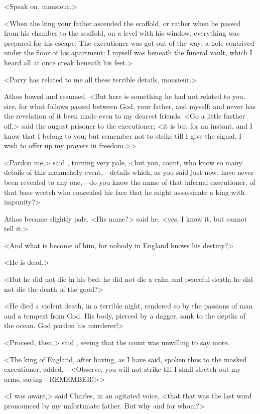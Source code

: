 <Speak on, monsieur.>

<When the king your father ascended the scaffold, or rather when he passed from his chamber to the scaffold, on a level with his window, everything was prepared for his escape. The executioner was got out of the way; a hole contrived under the floor of his apartment; I myself was beneath the funeral vault, which I heard all at once creak beneath his feet.>

<Parry has related to me all these terrible details, monsieur.>

Athos bowed and resumed. <But here is something he had not related to you, sire, for what follows passed between God, your father, and myself; and never has the revelation of it been made even to my dearest friends. <Go a little further off,> said the august prisoner to the executioner; <it is but for an instant, and I know that I belong to you; but remember not to strike till I give the signal. I wish to offer up my prayers in freedom.>>

<Pardon me,> said , turning very pale, <but you, count, who know so many details of this melancholy event,—details which, as you said just now, have never been revealed to any one,—do you know the name of that infernal executioner, of that base wretch who concealed his face that he might assassinate a king with impunity?>

Athos became slightly pale. <His name?> said he, <yes, I know it, but cannot tell it.>

<And what is become of him, for nobody in England knows his destiny?>

<He is dead.>

<But he did not die in his bed; he did not die a calm and peaceful death; he did not die the death of the good?>

<He died a violent death, in a terrible night, rendered so by the passions of man and a tempest from God. His body, pierced by a dagger, sank to the depths of the ocean. God pardon his murderer!>

<Proceed, then,> said , seeing that the count was unwilling to say more.

<The king of England, after having, as I have said, spoken thus to the masked executioner, added,—<Observe, you will not strike till I shall stretch out my arms, saying—REMEMBER!>>

<I was aware,> said Charles, in an agitated voice, <that that was the last word pronounced by my unfortunate father. But why and for whom?>


